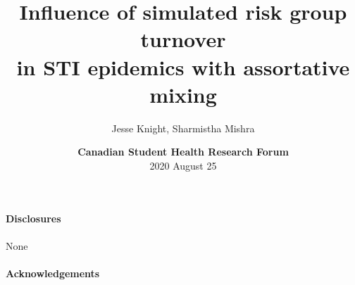 \documentclass[aspectratio=169]{beamer}
\title[Influence of risk group turnover under assortative mixing]
      {Influence of simulated risk group turnover\\
       in STI epidemics with assortative mixing}
\author{Jesse Knight, Sharmistha Mishra}
\institute{Institute of Medical Science\\University of Toronto}
\date{\textbf{Canadian Student Health Research Forum}\\[0.5em]\scriptsize
  2020 August 25}
\begin{document}
\begin{frame}
  \maketitle
\end{frame}
\begin{frame}
  \paragraph{Disclosures}
  \xpar
  None
  \vfill
  \paragraph{Acknowledgements}
  \xpar
  
\end{frame}
\end{document}
